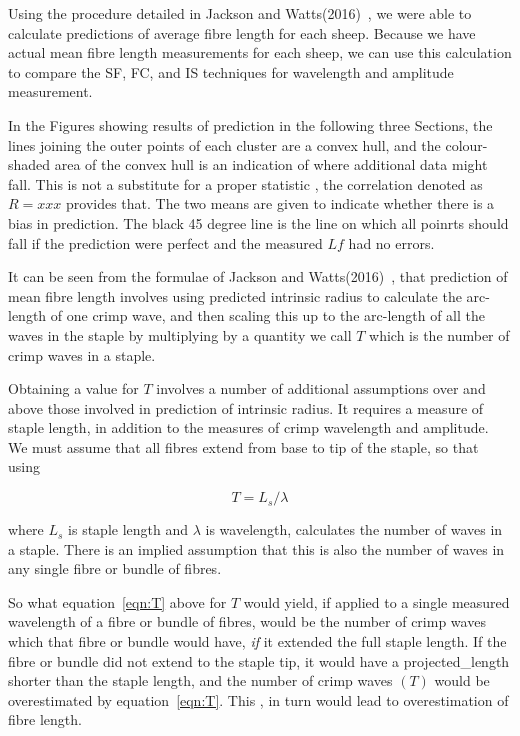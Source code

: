 \documentclass[titlepage,10pt]{article}  %
\begin{document}
 Using the procedure detailed in Jackson and Watts(2016)~\cite{jack:16}, we were able to calculate predictions of average fibre length  for each sheep.  Because we have actual mean fibre length measurements for each sheep, we can use this calculation to compare the SF, FC, and IS techniques for wavelength and amplitude measurement.

In the Figures showing results of prediction in the following three Sections, the lines joining the outer points of each cluster are a convex hull, and the colour-shaded area of the convex hull  is an indication of where additional data might fall. This is not a substitute for a proper statistic , the correlation denoted as $R = xxx$ provides that. The two means are given to indicate whether there is a bias in prediction. The black 45 degree line is the line on which all poinrts should fall if the prediction were perfect and the measured $Lf$ had no errors.


It can be seen from the formulae of Jackson and Watts(2016)~\cite{jack:16}, that prediction of mean fibre length involves using predicted intrinsic radius to calculate the arc-length of one crimp wave, and then  scaling this up to the arc-length of all the waves in the staple by multiplying by a quantity we call $T$ which is the number of crimp waves in a staple.

Obtaining a value for $T$ involves a number of additional assumptions over and above those involved in prediction of intrinsic radius. It requires a measure of staple length, in addition to the measures of crimp wavelength and amplitude. We must assume that all fibres extend from base to tip of the staple, so that using

\begin{equation}
\label{eqn:T}
T = L_{s}/\lambda
\end{equation}

where $L_{s}$ is staple length and $\lambda$ is wavelength,
calculates the number of waves in a staple. There is an implied assumption that this is also the number of waves in any single fibre or bundle of fibres.


So what equation~\ref{eqn:T} above for $T$ would yield, if applied to a single measured wavelength of a fibre or bundle of fibres, would be the number of crimp waves which that fibre or bundle would have, {\em if} it extended the full staple length. If the fibre or bundle did not extend to the staple tip, it would have a projected\_length shorter than the staple length, and the number of crimp waves $(T)$ would be overestimated by equation~\ref{eqn:T}. This , in turn would lead to overestimation of fibre length.
\end{document}
